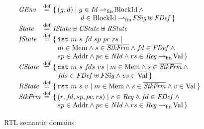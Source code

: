 
\begin{figure}
\[\begin{array}{@{}l@{~}c@{~}l@{}}
\rtlGEnv &\defeq& \setof{(g,d)\suchthat g\in \rtlId \fpfun \rtlBId {}\land{}\\
&&\qquad\quad~~~ d \in \rtlBId \fpfun \rtlFSig\uplus\rtlFunc}\\
\rtlState &\defeq& \rtlIState\uplus\rtlCState\uplus\rtlRState\\
\rtlIState&\defeq& \setof{\rtlist~m~s~\vfd~sp~pc~rs \suchthat\\
&&~~
m\in\rtlMem\land s\in\overline{\rtlStkFrm}
\land\vfd\in\rtlFunc\land{}\\
&&~~sp\in\rtlAddr \land pc\in\rtlNId\land
rs\in \rtlReg \fpfun \rtlVal
}
\\
\rtlCState&\defeq& \setof{\rtlcst~m~s~\vfds~vs\suchthat
m\in\rtlMem\land s\in\overline{\rtlStkFrm}{}\land{}\\
&&~~\vfds\in\rtlFunc\uplus\rtlFSig\land vs\in\overline{\rtlVal}
}
\\
\rtlRState&\defeq& \setof{\rtlrst~m~s~v \suchthat
m\in\rtlMem\land s\in\overline{\rtlStkFrm}\land
v\in \rtlVal
}
\\
\rtlStkFrm &\defeq& \setof{(r,\vfd,sp,pc,rs)\suchthat
r\in\rtlReg\land \vfd\in\rtlFunc\land{}\\
&&~~ sp\in\rtlAddr \land pc\in\rtlNId\land
rs\in \rtlReg \fpfun \rtlVal
}
\end{array}
\]
\caption{RTL semantic domains}
\label{fig:rtl-semdom}
\end{figure}

